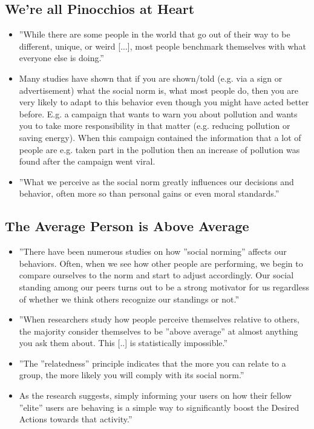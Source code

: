 \subsection{We're all Pinocchios at Heart}
\begin{itemize}
    \item ''While there are some people in the world that go out of their way to be different, unique, or weird [...], most people benchmark themselves with what everyone else is doing.''
    \item Many studies have shown that if you are shown/told (e.g. via a sign or advertisement) what the social norm is, what most people do, then you are very likely to adapt to this behavior even though you might have acted better before. E.g. a campaign that wants to warn you about pollution and wants you to take more responsibility in that matter (e.g. reducing pollution or saving energy). When this campaign contained the information that a lot of people are e.g. taken part in the pollution then an increase of pollution was found after the campaign went viral.
    \item ''What we perceive as the social norm greatly influences our decisions and behavior, often more so than personal gains or even moral standards.''
\end{itemize}

\subsection{The Average Person is Above Average}
\begin{itemize}
    \item ''There have been numerous studies on how ''social norming'' affects our behaviors. Often, when we see how other people are performing, we begin to compare ourselves to the norm and start to adjust accordingly. Our social standing among our peers turns out to be a strong motivator for us regardless of whether we think others recognize our standings or not.''
    \item ''When researchers study how people perceive themselves relative to others, the majority consider themselves to be ''above average'' at almost anything you ask them about. This [..] is statistically impossible.''
    \item ''The ''relatedness'' principle indicates that the more you can relate to a group, the more likely you will comply with its social norm.''
    \item As the research suggests, simply informing your users on how their fellow ''elite'' users are behaving is a simple way to significantly boost the Desired Actions towards that activity.''
\end{itemize}

